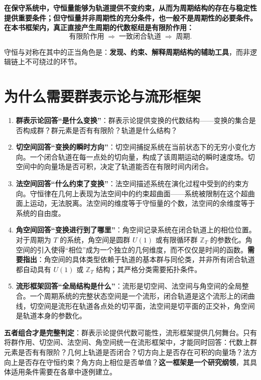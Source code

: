\textbf{在保守系统中，守恒量能够为轨道提供不变约束，从而为周期结构的存在与稳定性提供重要条件；但守恒量并非周期性的充分条件，也一般不是周期性的必要条件。在本书框架内，真正直接产生周期的代数枢纽是有限阶作用：}\[
\text{有限阶作用} \;\Longrightarrow\; \text{一致闭合轨道} \;\Longrightarrow\; \text{周期}.
\]

守恒与对称在其中的正当角色是：\textbf{发现、约束、解释周期结构的辅助工具}，而非逻辑链上不可绕过的环节。

\section*{为什么需要群表示论与流形框架}

\begin{enumerate}[label=(\roman*)]
    \item \textbf{群表示论回答“是什么变换”}：群表示论提供变换的代数结构——变换的集合是否构成群？群元素是否有有限阶？轨道是什么结构？
    \item \textbf{切空间回答“变换的瞬时方向”}：切空间捕捉系统在当前状态下的无穷小变化方向。一个闭合轨道在每一点处的切向量，构成了该周期运动的瞬时速度场。切空间中的向量场是否可积，决定了轨道能否在有限时间内闭合。
    \item \textbf{法空间回答“什么约束了变换”}：法空间描述系统在演化过程中受到的约束方向。守恒律在几何上表现为法空间中的约束超曲面——系统被限制在这个超曲面上运动，无法脱离。法空间的维度等于守恒量的个数，法空间的余维度等于系统的自由度。
    \item \textbf{角空间回答“变换进行到了哪里”}：角空间记录系统在闭合轨道上的相位位置。对于周期为 $T$ 的系统，角空间是圆群 $U(1)$ 或有限循环群 $\mathbb{Z}_T$ 的参数化。角空间的引入使得“相位”成为一个独立的几何维度，而不仅仅是时间的函数。\textbf{需要指出}：角空间的具体类型依赖于轨道的基本群与同伦类，并非所有闭合轨道都自动具有 $U(1)$ 或 $\mathbb{Z}_T$ 结构；其严格分类需要拓扑条件。
    \item \textbf{流形框架回答“全局结构是什么”}：流形是切空间、法空间与角空间的全局整合。一个周期系统的完整状态空间是一个流形，闭合轨道是这个流形上的闭曲线，切空间是流形在轨道各点处的切平面，法空间是切平面的正交补，角空间是轨道本身的参数化。
\end{enumerate}

\textbf{五者组合才是完整判定}：群表示论提供代数可能性，流形框架提供几何舞台。只有将群作用、切空间、法空间、角空间统一在流形框架中，才能同时回答：代数上群元素是否有有限阶？几何上轨道是否闭合？切方向上是否存在可积的向量场？法方向上是否存在守恒约束？角方向上相位是否单值？\textbf{这一框架是一个研究纲领}，其具体适用条件需要在各章中逐例建立。

